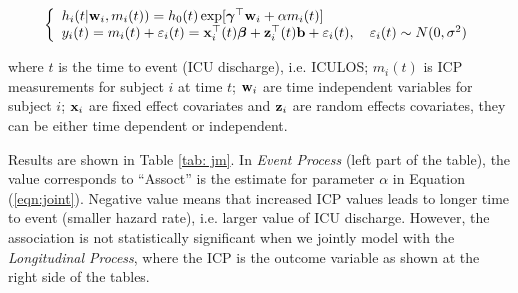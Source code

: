 \documentclass{article}
\begin{document}
\begin{equation}\label{eqn:joint}
\left\{
\begin{array}{l}
h_i(t| {\bf w}_i, m_i(t))=h_0(t)\exp[\boldsymbol{\gamma}^{\top}{\bf w}_i+\alpha m_i(t)]\\
y_i(t) = m_i(t) + \varepsilon_i(t) = {\bf x}_i^{\top}(t)\boldsymbol{\beta} + {\bf z}_i^{\top}(t){\bf b} + \varepsilon_i(t),\hspace{1em} \varepsilon_i(t)\sim N(0, \sigma^2)
\end{array}
\right.
\end{equation}

\noindent where $t$ is the time to event (ICU discharge), i.e. ICULOS; $m_i(t)$ is ICP measurements for subject $i$ at time $t$; ${\bf w}_i$ are time independent variables for subject $i$; ${\bf x}_i$ are fixed effect covariates and ${\bf z}_i$ are random effects covariates, they can be either time dependent or independent. 

Results are shown in Table \ref{tab: jm}. In \emph{Event Process} (left part of the table), the value corresponds to ``Assoct'' is the estimate for parameter $\alpha$ in Equation (\ref{eqn:joint}). Negative value means that increased ICP values leads to longer time to event (smaller hazard rate), i.e. larger value of ICU discharge. However, the association is not statistically significant when we jointly model with the \emph{Longitudinal Process}, where the ICP is the outcome variable as shown at the right side of the tables.
\end{document}
